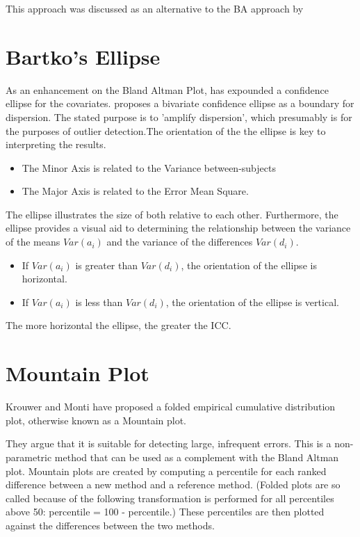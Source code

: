 \documentclass[12pt, a4paper]{article}
\begin{document}
This approach was discussed as an alternative to the BA approach by 
\newpage
\section{Bartko's Ellipse}
As an enhancement on the Bland Altman Plot, \citep{bartko} has
expounded a confidence ellipse for the covariates. \citet{bartko} proposes
a bivariate confidence ellipse as a boundary for dispersion. The stated purpose is to 'amplify dispersion', which presumably is for  the purposes of outlier detection.The orientation of the the ellipse is key to interpreting the results.
\begin{itemize}
 \item The Minor Axis is related to the Variance between-subjects
 \item The Major Axis is related to the Error Mean Square.
\end{itemize}
The ellipse illustrates the size of both relative to each
other. Furthermore, the ellipse provides a visual aid to determining the relationship
between the variance of the means $Var(a_{i})$ and the variance of the differences $Var(d_{i})$.
\begin{itemize}
 \item If $Var(a_{i})$ is greater than $Var(d_{i})$, the orientation of the ellipse is horizontal.
 \item If $Var(a_{i})$ is less than $Var(d_{i})$, the orientation of the ellipse is vertical.
\end{itemize}
The more horizontal the ellipse, the greater the ICC.

\newpage

\section{Mountain Plot} Krouwer and Monti have proposed a folded empirical cumulative distribution plot, otherwise known as a Mountain plot.

They argue that it is suitable for detecting large, infrequent errors. This is a non-parametric method that can be used as a complement with the Bland Altman plot.  Mountain plots are created by computing a percentile
for each ranked difference between a new method and a reference method. (Folded plots are so called because of the following transformation is performed for all percentiles above 50: percentile = 100 - percentile.) These percentiles are then plotted against the differences between the two methods.
\end{document}
